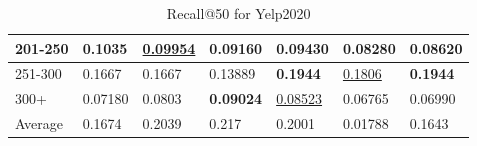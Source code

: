 \begin{table*}[]
\begin{tabular}{|l|l|l|l|l|l|l|}
        201-250   & \textbf{0.1035}                & \underline{0.09954}            & 0.09160                        & 0.09430                        & 0.08280                        & 0.08620                        \\ \hline
        251-300   & 0.1667                         & 0.1667                         & 0.13889                        & \textbf{0.1944}                & \underline{0.1806}             & \textbf{0.1944}                \\ \hline
        300+      & 0.07180                        & 0.0803                         & \textbf{0.09024}               & \underline{0.08523}            & 0.06765                        & 0.06990                        \\ \hline
        Average   & 0.1674                         & 0.2039                         & 0.217                          & 0.2001                         & 0.01788                        & 0.1643                         \\ \hline
    \end{tabular}
    \caption{Recall@50 for Yelp2020}
    \label{tab:yelp2020-recall-evaluation}
\end{table*}
